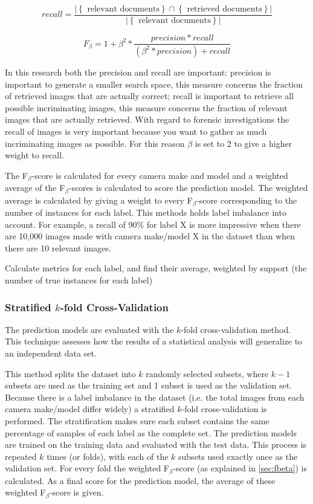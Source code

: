 \begin{equation}\label{eq:1}
recall = \frac{ \left\vert{\left\{ \text{ relevant documents} \right\} \cap \left\{ \text{ retrieved documents} \right\}}\right\vert }{ \left\vert{\left\{ \text{ relevant documents} \right\}}\right\vert}
\end{equation}


\begin{equation}\label{eq:1}
F_\beta = 1 + \beta^{2} * \frac{precision * recall}{(\beta^{2} *precision) + recall}
\end{equation}

In this research both the precision and recall are important: precision is important to generate a smaller search space, this measure concerns the fraction of retrieved images that are actually correct; recall is important to retrieve all possible incriminating images, this measure concerns the fraction of relevant images that are actually retrieved. With regard to forensic investigations the recall of images is very important because you want to gather as much incriminating images as possible. For this reason $\beta$ is set to 2 to give a higher weight to recall. 

The F$_\beta$-score is calculated for every camera make and model and a weighted average of the F$_\beta$-scores is calculated to score the prediction model. The weighted average is calculated by giving a weight to every F$_\beta$-score corresponding to the number of instances for each label. This methods holds label imbalance into account. For example, a recall of 90\% for label X is more impressive when there are 10,000 images made with camera make/model X in the dataset than when there are 10 relevant images.

Calculate metrics for each label, and find their average, weighted by support (the number of true instances for each label)

\subsubsection{Stratified $k$-fold Cross-Validation}
The prediction models are evaluated with the $k$-fold cross-validation method. This technique assesses how the results of a statistical analysis will generalize to an independent data set.

This method splits the dataset into $k$ randomly selected subsets, where $k-1$ subsets are used as the training set and 1 subset is used as the validation set. Because there is a label imbalance in the dataset (i.e. the total images from each camera make/model differ widely) a stratified   $k$-fold cross-validation is performed. The stratification makes sure each subset contains the same percentage of samples of each label as the complete set. The prediction models are trained on the training data and evaluated with the test data. This process is repeated $k$ times (or folds), with each of the $k$ subsets used exactly once as the validation set. For every fold the weighted F$_\beta$-score (as explained in \autoref{sec:fbeta}) is calculated. As a final score for the prediction model, the average of these weighted F$_\beta$-score is given.

